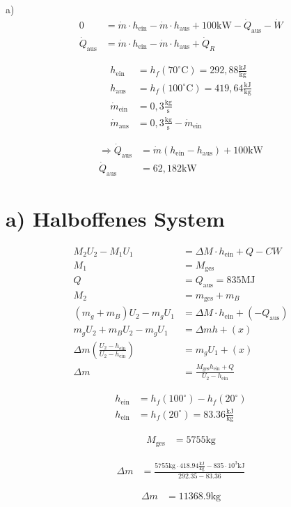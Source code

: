 a) 
\begin{align*}
0 &= \dot{m} \cdot h_{\text{ein}} - \dot{m} \cdot h_{\text{aus}} + 100 \text{kW} - \dot{Q}_{\text{aus}} - \dot{W} \\
\dot{Q}_{\text{aus}} &= \dot{m} \cdot h_{\text{ein}} - \dot{m} \cdot h_{\text{aus}} + \dot{Q}_R
\end{align*}

\begin{align*}
h_{\text{ein}} &= h_f (70^\circ \text{C}) = 292,88 \frac{\text{kJ}}{\text{kg}} \\
h_{\text{aus}} &= h_f (100^\circ \text{C}) = 419,64 \frac{\text{kJ}}{\text{kg}} \\
\dot{m}_{\text{ein}} &= 0,3 \frac{\text{kg}}{\text{s}} \\
\dot{m}_{\text{aus}} &= 0,3 \frac{\text{kg}}{\text{s}} - \dot{m}_{\text{ein}}
\end{align*}

\begin{align*}
\Rightarrow \dot{Q}_{\text{aus}} &= \dot{m} (h_{\text{ein}} - h_{\text{aus}}) + 100 \text{kW} \\
\dot{Q}_{\text{aus}} &= 62,182 \text{kW}
\end{align*}

\section*{a) Halboffenes System}

\begin{align*}
    M_2 U_2 - M_1 U_1 &= \Delta M \cdot h_{\text{ein}} + Q - CW \\
    M_1 &= M_{\text{ges}} \\
    Q &= Q_{\text{aus}} = 835 \text{MJ} \\
    M_2 &= m_{\text{ges}} + m_B \\
    (m_g + m_B) U_2 - m_g U_1 &= \Delta M \cdot h_{\text{ein}} + (-Q_{\text{aus}}) \\
    m_g U_2 + m_B U_2 - m_g U_1 &= \Delta m h + (x) \\
    \Delta m \left( \frac{U_2 - h_{\text{ein}}}{U_2 - h_{\text{ein}}} \right) &= m_g U_1 + (x) \\
    \Delta m &= \frac{M_{\text{ges}} h_{\text{ein}} + Q}{U_2 - h_{\text{ein}}}
\end{align*}

\begin{align*}
    h_{\text{ein}} &= h_f(100^\circ) - h_f(20^\circ) \\
    h_{\text{ein}} &= h_f(20^\circ) = 83.36 \frac{\text{kJ}}{\text{kg}}
\end{align*}

\begin{align*}
    M_{\text{ges}} &= 5755 \text{kg}
\end{align*}

\begin{align*}
    \Delta m &= \frac{5755 \text{kg} \cdot 418.94 \frac{\text{kJ}}{\text{kg}} - 835 \cdot 10^3 \text{kJ}}{292.35 - 83.36}
\end{align*}

\begin{align*}
    \Delta m &= 11368.9 \text{kg}
\end{align*}